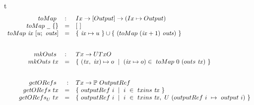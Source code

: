 \begin{ruledfigure}{t}
  \begin{displaymath}
  \begin{array}{rll}
    \fun{toMap}~ &:& \Ix \to [\Output] \to (\Ix \mapsto \Output) \\
    \fun{toMap}~\wcard~\{\} &=& [~] \\
    \fun{toMap}~\var{ix}~[u;~\var{outs}] &=& \{~\var{ix}\mapsto u~\} \cup \{~(\fun{toMap}~(\var{ix}+1)~\var{outs})~\}\\
    \nextdef
    \fun{mkOuts}~ &:& \Tx \to \UTxO \\
    \fun{mkOuts}~{tx} &=& \{~(\var{tx},~\var{ix}) \mapsto o~ \mid~(\var{ix} \mapsto o)\in~\fun{toMap}~0~(\outputs~\var{tx})~\}\\
    \nextdef
    \fun{getORefs}~&~:& \Tx \to \powerset{\OutputRef} \\
    \fun{getORefs}~{tx} &=& \{~\outputref~i~\mid~i~\in~\inputs~\var{tx} ~\} \\
    \fun{getORefs}_U~{tx} &=& \{~\outputref~i~\mid~i~\in~\inputs~\var{tx},~U~(\outputref~i~\mapsto~\fun{output}~i) ~\} \\

\end{array}
\end{displaymath}
\end{ruledfigure}
